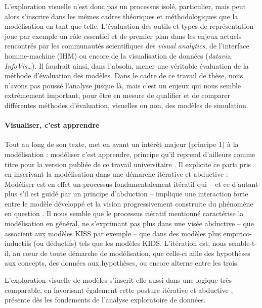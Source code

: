 \noindent L'exploration visuelle n'est donc pas un processus isolé, particulier, mais peut alors s'inscrire dans les mêmes cadres théoriques et méthodologiques que la modélisation en tant que telle.
L'évaluation des outils et types de représentation joue par exemple un rôle essentiel et de premier plan dans les enjeux actuels rencontrés par les communautés scientifiques des \textit{visual analytics}, de l'interface homme-machine (IHM) ou encore de la visualisation de données (\textit{dataviz}, \textit{InfoVis}\ldots).
Il faudrait ainsi, dans l'absolu, mener une véritable évaluation de la méthode d'évaluation des modèles.
Dans le cadre de ce travail de thèse, nous n'avons pas poussé l'analyse jusque là, mais c'est un enjeux qui nous semble extrêmement important, pour être en mesure de qualifier et de comparer différentes méthodes d'évaluation, visuelles ou non, des modèles de simulation.

\paragraph{Visualiser, c'est apprendre}
Tout au long de son texte, \textcite{banos_pour_2013} met en avant un intérêt majeur (principe 1) à la modélisation : \og modéliser c'est apprendre\fg{}, principe qu'il reprend d'ailleurs comme titre pour la version publiée de ce travail universitaire \autocite{banos_modeliser_2016}.
Il explicite ce parti pris en inscrivant la modélisation dans une démarche itérative et abductive : \og
Modéliser est en effet un processus fondamentalement itératif qui -- et ce d'autant plus s'il est guidé par un principe d'abduction -- implique une interaction forte entre le modèle développé et la vision progressivement construite du phénomène en question
\fg{} \autocite[77]{banos_pour_2013}.
Il nous semble que le processus itératif mentionné caractérise la modélisation en général, ne s'exprimant pas plus dans une visée abductive -- que \textcite{livet2014diversite} associent aux modèles KISS par exemple -- que dans des modèles plus empirico-inductifs (ou déductifs) tels que les modèles KIDS.
L'itération est, nous semble-t-il, au cœur de toute démarche de modélisation, que celle-ci aille des hypothèses aux concepts, des données aux hypothèses, ou encore alterne entre les trois. 

\noindent L'exploration visuelle de modèles s'inscrit elle aussi dans une logique très comparable, en favorisant également cette posture itérative et abductive \autocite[\ppno~239--240]{banos2005voie}, présente dès les fondements de l'analyse exploratoire de données.

